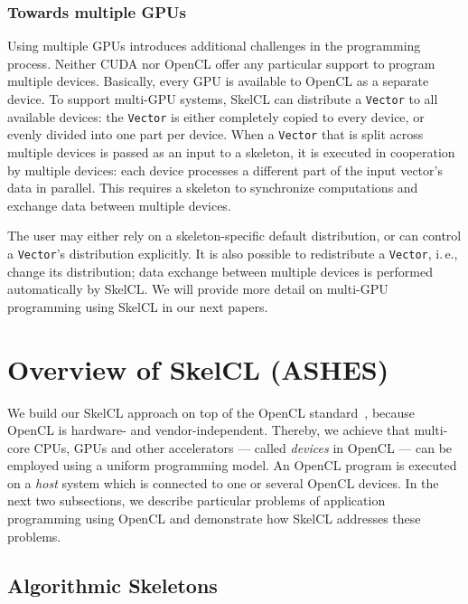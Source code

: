 \subsubsection{Towards multiple GPUs}

Using multiple GPUs introduces additional challenges in the programming process.
Neither CUDA nor OpenCL offer any particular support to program multiple devices.
Basically, every GPU is available to OpenCL as a separate device.
To support multi-GPU systems, SkelCL can distribute a \texttt{Vector} to all available devices:
the \texttt{Vector} is either completely copied to every device, or evenly divided into one part per device.
When a \texttt{Vector} that is split across multiple devices is passed as an input to a skeleton, it is executed in cooperation by multiple devices:
each device processes a different part of the input vector's data in parallel.
This requires a skeleton to synchronize computations and exchange data between multiple devices.

The user may either rely on a skeleton-specific default distribution, or can control a \texttt{Vector}'s distribution explicitly.
It is also possible to redistribute a \texttt{Vector}, i.\,e., change its distribution;
data exchange between multiple devices is performed automatically by SkelCL.
We will provide more detail on multi-GPU programming using SkelCL in our next papers.




\section{Overview of SkelCL (ASHES)} 

We build our SkelCL approach on top of the OpenCL standard~\cite{OpenCL-11}, because OpenCL is hardware- and vendor-independent.
Thereby, we achieve that multi-core CPUs, GPUs and other accelerators --- called \emph{devices} in OpenCL --- can be employed using a uniform programming model.
An OpenCL program is executed on a \emph{host} system which is connected to one or several OpenCL devices.
In the next two subsections, we describe particular problems of application programming using OpenCL and demonstrate how SkelCL addresses these problems.

\subsection{Algorithmic Skeletons}

